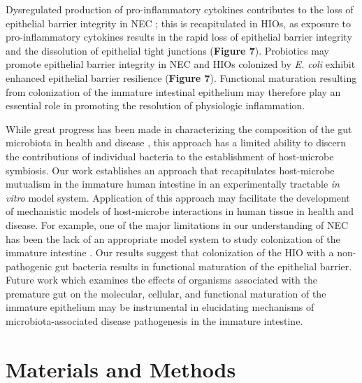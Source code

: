 \documentclass[9pt,lineo]{elife}
\begin{document}
Dysregulated production of pro-inflammatory cytokines  contributes to the loss of epithelial barrier integrity in NEC \citep{Tanner:2015,Hackam:2013,Neu:2011,Nanthakumar:2011,Halpern:2003,Ford:1997,Ford:1996,Tan:1993}; this is recapitulated in HIOs, as exposure to pro-inflammatory cytokines results in the rapid loss of epithelial barrier integrity and the dissolution of epithelial tight junctions (\textbf{Figure 7}). Probiotics may promote epithelial barrier integrity in NEC \citep{Robinson:2014,Alfaleh:2011,Underwood:2014,Khailova:2009} and HIOs colonized by \emph{E. coli} exhibit enhanced epithelial barrier resilience (\textbf{Figure 7}). Functional maturation resulting from colonization of the immature intestinal epithelium may therefore play an essential role in promoting the resolution of physiologic inflammation.

While great progress has been made in characterizing the composition of the gut microbiota in health and disease \citep{Shreiner:2015,Costello:2012}, this approach has a limited ability to discern the contributions of individual bacteria to the establishment of host-microbe symbiosis. Our work establishes an approach that recapitulates host-microbe mutualism in the immature human intestine in an experimentally tractable \emph{in vitro} model system. Application of this approach may facilitate the development of mechanistic models of host-microbe interactions in human tissue in health and disease. For example, one of the major limitations in our understanding of NEC has been the lack of an appropriate model system to study colonization of the immature intestine \citep{Neu:2011,Balimane:2005,Tanner:2015,Nguyen:2015}. Our results suggest that colonization of the HIO with a non-pathogenic gut bacteria results in functional maturation of the epithelial barrier. Future work which examines the effects of organisms associated with the premature gut \citep{Morrow:2013,Greenwood:2014,Ward:2016} on the molecular, cellular, and functional maturation of the immature epithelium may be instrumental in elucidating mechanisms of microbiota-associated disease pathogenesis in the immature intestine.

\section*{{\bfseries\sffamily } Materials and Methods}
\label{sec:orgheadline25}
\end{document}
